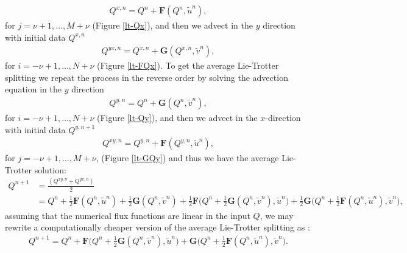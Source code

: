 \begin{align*}
	{Q}^{x,n} =  {Q}^{n} + \mathbf{F}({Q^n}, \tilde{u}^n),
\end{align*}
for $j=\nu+1, \ldots, M+\nu$ (Figure \ref{lt-Qx}), and then we advect in the $y$ direction with initial data ${Q}^{x,n}$ 
\begin{align*}
	{Q}^{yx,n} = Q^{x,n} + \mathbf{G}({Q}^{x,n},\tilde{v}^n),
\end{align*}
for $i=-\nu+1, \ldots, N+\nu$ (Figure \ref{lt-FQx}).
To get the average Lie-Trotter splitting we repeat the process in the reverse order by solving the advection equation
in the $y$ direction
\begin{align*}
	{Q}^{y,n} =  {Q}^{n} + \mathbf{G}({Q^n},\tilde{v}^n),
\end{align*}
for $i=-\nu+1, \ldots, N+\nu$ (Figure \ref{lt-Qy}), and then we advect in the $x$-direction with initial data ${Q}^{y,n+1}$ 
\begin{align*}
	{Q}^{xy,n} = Q^{y,n} + \mathbf{F}(Q^{y,n},\tilde{u}^n),
\end{align*}
for $j=-\nu+1, \ldots, M+\nu$, (Figure \ref{lt-GQy}) and thus we have the average Lie-Trotter solution:
\begin{align*}
	Q^{n+1} &= \frac{(Q^{xy,n} + Q^{yx,n})}{2} \\
    &= Q^n + \frac{1}{2}\mathbf{F}(Q^n,\tilde{u}^n) + \frac{1}{2}\mathbf{G}(Q^n,\tilde{v}^n) + 
    \frac{1}{2}\mathbf{F}\bigg(Q^n + \frac{1}{2}\mathbf{G}(Q^n, \tilde{v}^n), \tilde{u}^n\bigg)+
    \frac{1}{2}\mathbf{G}\bigg(Q^n + \frac{1}{2}\mathbf{F}(Q^n, \tilde{u}^n), \tilde{v}^n\bigg),
\end{align*}
assuming that the numerical flux functions are linear in the input $Q$, we may rewrite a computationally cheaper version
of the average Lie-Trotter splitting as \citep{lin:1996}:
\begin{align}
	\label{chp3-avlt}
	Q^{n+1} =  Q^n+
	\mathbf{F}\bigg(Q^n + \frac{1}{2}\mathbf{G}(Q^n, \tilde{v}^n), \tilde{u}^n \bigg) +  
	\mathbf{G}\bigg(Q^n + \frac{1}{2}\mathbf{F}(Q^n, \tilde{u}^n), \tilde{v}^n \bigg).
\end{align}

